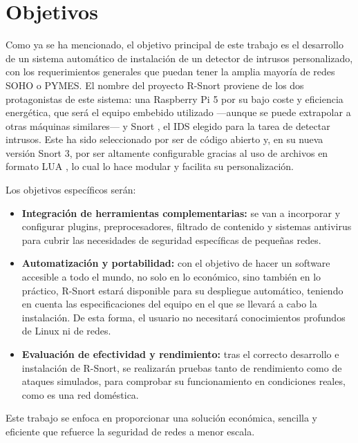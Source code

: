 \documentclass[11pt,a4paper,twoside]{report}
\begin{document}
\chapter{Objetivos}
Como ya se ha mencionado, el objetivo principal de este trabajo es el desarrollo de un sistema automático de instalación de un detector de intrusos personalizado, con los requerimientos generales que puedan tener la amplia mayoría de redes SOHO o PYMES. El nombre del proyecto R-Snort proviene de los dos protagonistas de este sistema: una Raspberry Pi 5 \cite{rodriguez2018cluster} por su bajo coste y eficiencia energética, que será el equipo embebido utilizado —aunque se puede extrapolar a otras máquinas similares— y Snort \cite{roesch1999snort}, el IDS elegido para la tarea de detectar intrusos. Este ha sido seleccionado por ser de código abierto y, en su nueva versión Snort 3, por ser altamente configurable gracias al uso de archivos en formato LUA \cite{snort3_official}, lo cual lo hace modular y facilita su personalización.\newline

Los objetivos específicos serán:

\begin{itemize}
    \item \textbf{Integración de herramientas complementarias:} se van a incorporar y configurar plugins, preprocesadores, filtrado de contenido y sistemas antivirus para cubrir las necesidades de seguridad específicas de pequeñas redes.
    
    \item \textbf{Automatización y portabilidad:} con el objetivo de hacer un software accesible a todo el mundo, no solo en lo económico, sino también en lo práctico, R-Snort estará disponible para su despliegue automático, teniendo en cuenta las especificaciones del equipo en el que se llevará a cabo la instalación. De esta forma, el usuario no necesitará conocimientos profundos de Linux ni de redes.
    
    \item \textbf{Evaluación de efectividad y rendimiento:} tras el correcto desarrollo e instalación de R-Snort, se realizarán pruebas tanto de rendimiento como de ataques simulados, para comprobar su funcionamiento en condiciones reales, como es una red doméstica.
    
\end{itemize}

Este trabajo se enfoca en proporcionar una solución económica, sencilla y eficiente que refuerce la seguridad de redes a menor escala.
\end{document}
